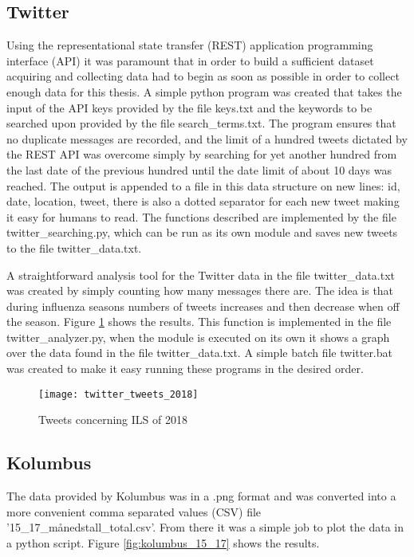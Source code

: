 \subsection{Twitter}
Using the representational state transfer (REST) application programming interface (API) it was paramount that in order to build a sufficient dataset acquiring and collecting data had to begin as soon as possible in order to collect enough data for this thesis. A simple python program was created that takes the input of the API keys provided by the file keys.txt and the keywords to be searched upon provided by the file search\_terms.txt. The program ensures that no duplicate messages are recorded, and the limit of a hundred tweets dictated by the REST API was overcome simply by searching for yet another hundred from the last date of the previous hundred until the date limit of about 10 days was reached.
The output is appended to a file in this data structure on new lines: id, date, location, tweet, there is also a dotted separator for each new tweet making it easy for humans to read. The functions described are implemented by the file twitter\_searching.py, which can be run as its own module and saves new tweets to the file twitter\_data.txt.

A straightforward analysis tool for the Twitter data in the file twitter\_data.txt was created by simply counting how many messages there are. The idea is that during influenza seasons numbers of tweets increases and then decrease when off the season. Figure \ref{fig:twitterAnal} shows the results. This function is implemented in the file twitter\_analyzer.py, when the module is executed on its own it shows a graph over the data found in the file twitter\_data.txt. A simple batch file twitter.bat was created to make it easy running these programs in the desired order.

\begin{figure}[ht]
\texttt{[image: twitter\_tweets\_2018]}
\centering
\caption{Tweets concerning ILS of 2018}
\label{fig:twitterAnal}
\end{figure}








\subsection{Kolumbus}
The data provided by Kolumbus was in a .png format and was converted into a more convenient comma separated values (CSV) file '15\_17\_månedstall\_total.csv'. From there it was a simple job to plot the data in a python script. Figure \ref{fig:kolumbus_15_17} shows the results.


